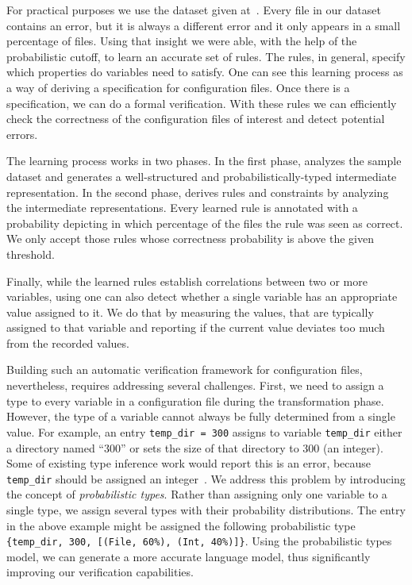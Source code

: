 For practical purposes we use the dataset given at~\cite{configdataset}. Every file in our dataset contains an error, but it is 
always a different error and it only appears in a small percentage of files. Using that insight we were able, with the help of the probabilistic cutoff, to learn an
accurate set of rules. The rules, in general, specify which properties do variables need to satisfy. One can see this learning process as a
way of deriving  
a specification for configuration files.  Once there is a specification, we can do a formal verification. With these 
rules we can efficiently check the correctness of the configuration files
of interest and detect potential errors.

The learning process works in two phases. In the first phase, 
\app analyzes the sample dataset and generates a 
well-structured and probabilistically-typed 
intermediate representation. 
In the second phase, \app derives rules and constraints by analyzing
the intermediate representations.  Every learned rule is annotated with a probability depicting in
which percentage of the files the rule was seen as correct. We only accept those rules whose 
correctness probability is above the given threshold. 

Finally, while the learned rules establish correlations between two or more variables, using \app one can also detect whether a
single variable has an appropriate value assigned to it. We do that by measuring the values, that are typically assigned to that variable 
and reporting if the current value deviates too much from the recorded values.

Building such an automatic verification framework for
configuration files, nevertheless, requires addressing several challenges. 
First, we need to assign a type to every variable in a configuration file during the transformation phase.
However,
the type of a variable cannot always be fully determined 
from a single value. 
For example, an entry {\tt temp\_dir = 300} assigns to variable {\tt temp\_dir} either a directory named ``300'' or sets the size of that directory to 300 (an integer).
Some of existing type inference 
work would report this is an error, because {\tt temp\_dir} should be assigned
an integer~\cite{zhang14encore}. We address this problem by introducing the concept of
{\emph{probabilistic types}}.
Rather than assigning only one variable to a single type, 
we assign several types with their probability distributions. 
The entry in the above example might be assigned 
the following probabilistic type
{\tt \{temp\_dir, 300, [(File, 60\%), (Int, 40\%)]\}}.
Using the probabilistic types model,
we can generate a more accurate language model,
thus significantly improving our verification capabilities.

